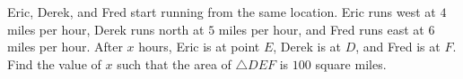 Eric, Derek, and Fred start running from the same location. Eric runs west at $4$ miles per hour, Derek runs north at $5$ miles per hour, and Fred runs east at $6$ miles per hour. After $x$ hours, Eric is at point $E$, Derek is at $D$, and Fred is at $F$. Find the value of $x$ such that the area of $\triangle DEF$ is $100$ square miles.
